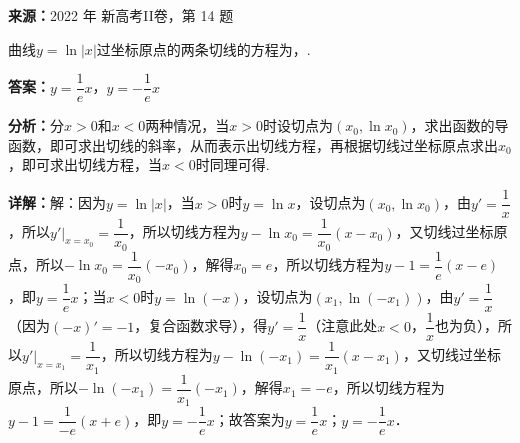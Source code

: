 \begin{question}[points=5]
\textbf{来源：}2022 年 新高考II卷，第 14 题\par
曲线$y=\ln|x|$过坐标原点的两条切线的方程为，.
\fillin[{$y=\dfrac{1}{e}x$，$y=-\dfrac{1}{e}x$}]
\begin{solution}
\textbf{答案：}$y=\dfrac{1}{e}x$，$y=-\dfrac{1}{e}x$

\textbf{分析：}分$x>0$和$x<0$两种情况，当$x>0$时设切点为$(x_0,\ln x_0)$，求出函数的导函数，即可求出切线的斜率，从而表示出切线方程，再根据切线过坐标原点求出$x_0$，即可求出切线方程，当$x<0$时同理可得.

\textbf{详解：}解：因为$y=\ln|x|$，当$x>0$时$y=\ln x$，设切点为$(x_0,\ln x_0)$，由$y'=\dfrac{1}{x}$，所以$y'|_{x=x_0}=\dfrac{1}{x_0}$，所以切线方程为$y-\ln x_0=\dfrac{1}{x_0}(x-x_0)$，又切线过坐标原点，所以$-\ln x_0=\dfrac{1}{x_0}(-x_0)$，解得$x_0=e$，所以切线方程为$y-1=\dfrac{1}{e}(x-e)$，即$y=\dfrac{1}{e}x$；当$x<0$时$y=\ln(-x)$，设切点为$(x_1,\ln(-x_1))$，由$y'=\dfrac{1}{x}$（因为$(-x)'=-1$，复合函数求导），得$y'=\dfrac{1}{x}$（注意此处$x<0$，$\dfrac{1}{x}$也为负），所以$y'|_{x=x_1}=\dfrac{1}{x_1}$，所以切线方程为$y-\ln(-x_1)=\dfrac{1}{x_1}(x-x_1)$，又切线过坐标原点，所以$-\ln(-x_1)=\dfrac{1}{x_1}(-x_1)$，解得$x_1=-e$，所以切线方程为$y-1=\dfrac{1}{-e}(x+e)$，即$y=-\dfrac{1}{e}x$；故答案为$y=\dfrac{1}{e}x$；$y=-\dfrac{1}{e}x$．
\end{solution}
\end{question}

